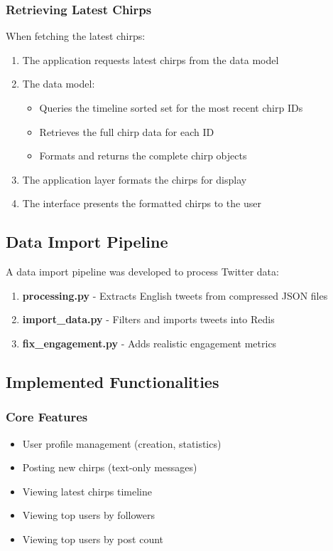 \documentclass[a4paper,11pt]{article}
\begin{document}
\subsubsection{Retrieving Latest Chirps}
When fetching the latest chirps:

\begin{enumerate}
    \item The application requests latest chirps from the data model
    \item The data model:
        \begin{itemize}
            \item Queries the timeline sorted set for the most recent chirp IDs
            \item Retrieves the full chirp data for each ID
            \item Formats and returns the complete chirp objects
        \end{itemize}
    \item The application layer formats the chirps for display
    \item The interface presents the formatted chirps to the user
\end{enumerate}

\subsection{Data Import Pipeline}
A data import pipeline was developed to process Twitter data:

\begin{enumerate}
    \item \textbf{processing.py} - Extracts English tweets from compressed JSON files
    \item \textbf{import\_data.py} - Filters and imports tweets into Redis
    \item \textbf{fix\_engagement.py} - Adds realistic engagement metrics
\end{enumerate}

\subsection{Implemented Functionalities}

\subsubsection{Core Features}
\begin{itemize}
    \item User profile management (creation, statistics)
    \item Posting new chirps (text-only messages)
    \item Viewing latest chirps timeline
    \item Viewing top users by followers
    \item Viewing top users by post count
\end{itemize}
\end{document}
